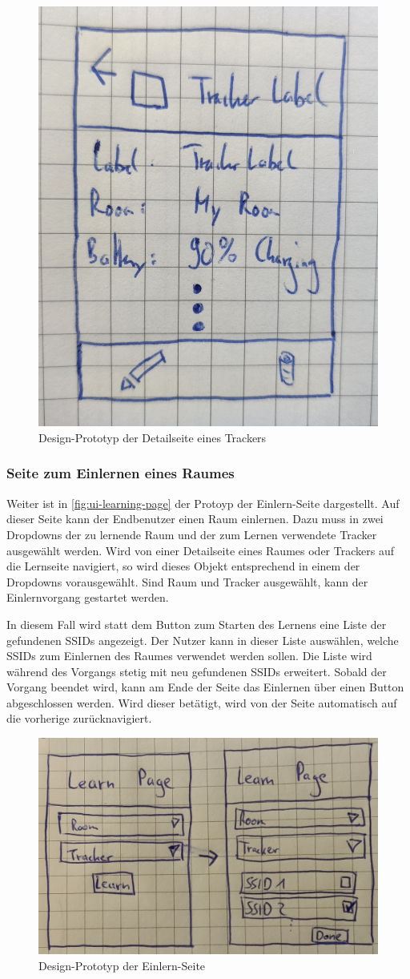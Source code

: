 \begin{figure}[h!tbp]
	\includegraphics[width=.5\textwidth]{images/ui-prototype/detail_page.jpg}
	\centering
	\caption{Design-Prototyp der Detailseite eines Trackers}
	\label{fig:ui-detail-page}
\end{figure}

\subsubsection{Seite zum Einlernen eines Raumes}

Weiter ist in \autoref{fig:ui-learning-page} der Protoyp der Einlern-Seite dargestellt.
Auf dieser Seite kann der Endbenutzer einen Raum einlernen.
Dazu muss in zwei Dropdowns der zu lernende Raum und der zum Lernen verwendete Tracker ausgewählt werden.
Wird von einer Detailseite eines Raumes oder Trackers auf die Lernseite navigiert, so wird dieses Objekt entsprechend in einem der Dropdowns vorausgewählt.
Sind Raum und Tracker ausgewählt, kann der Einlernvorgang gestartet werden.

In diesem Fall wird statt dem Button zum Starten des Lernens eine Liste der gefundenen \glspl{SSID} angezeigt.
Der Nutzer kann in dieser Liste auswählen, welche \glspl{SSID} zum Einlernen des Raumes verwendet werden sollen.
Die Liste wird während des Vorgangs stetig mit neu gefundenen \glspl{SSID} erweitert.
Sobald der Vorgang beendet wird, kann am Ende der Seite das Einlernen über einen Button abgeschlossen werden.
Wird dieser betätigt, wird von der Seite automatisch auf die vorherige zurücknavigiert.

\begin{figure}[h!tbp]
	\includegraphics[width=.7\textwidth]{images/ui-prototype/learning_page.jpg}
	\centering
	\caption{Design-Prototyp der Einlern-Seite}
	\label{fig:ui-learning-page}
\end{figure}


